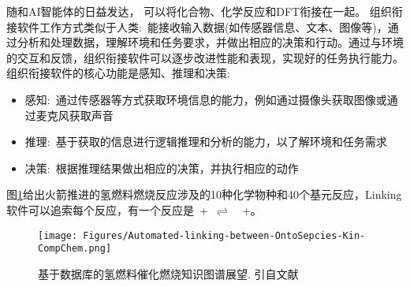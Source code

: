 随和\textrm{AI}智能体的日益发达，%
可以将化合物、化学反应和\textrm{DFT}衔接在一起。%
组织衔接软件工作方式类似于人类:~能接收输入数据(如传感器信息、文本、图像等)，通过分析和处理数据，理解环境和任务要求，并做出相应的决策和行动。通过与环境的交互和反馈，组织衔接软件可以逐步改进性能和表现，实现好的任务执行能力。组织衔接软件的核心功能是感知、推理和决策:
\begin{itemize}
	\item 感知:~通过传感器等方式获取环境信息的能力，例如通过摄像头获取图像或通过麦克风获取声音
	\item 推理:~基于获取的信息进行逻辑推理和分析的能力，以了解环境和任务需求
	\item 决策:~根据推理结果做出相应的决策，并执行相应的动作 
\end{itemize}
图\ref{Fig:Automated-linking-between-OntoSpecies-Kin-CompChem}给出火箭推进的氢燃料燃烧反应涉及的10种化学物种和40个基元反应，\textrm{Linking}软件可以追索每个反应，有一个反应是~+~$\rightleftharpoons$~~+。
\begin{figure}[h!]
\centering
\texttt{[image: Figures/Automated-linking-between-OntoSepcies-Kin-CompChem.png]}
\caption{\small\textrm{基于数据库的氢燃料催化燃烧知识图谱展望. 引自文献~\cite{ACR56-128_2023}}}%
\label{Fig:Automated-linking-between-OntoSpecies-Kin-CompChem}
\end{figure}


